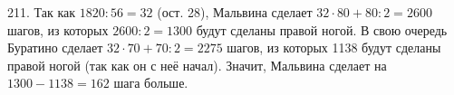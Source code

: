 211. Так как $1820:56=32$ (ост. 28), Мальвина сделает $32\cdot80+80:2=2600$ шагов, из которых $2600:2=1300$ будут сделаны правой ногой. В свою очередь Буратино сделает $32\cdot70+70:2=2275$ шагов, из которых 1138 будут сделаны правой ногой (так как он с неё начал). Значит, Мальвина сделает на $1300-1138=162$ шага больше.\\
